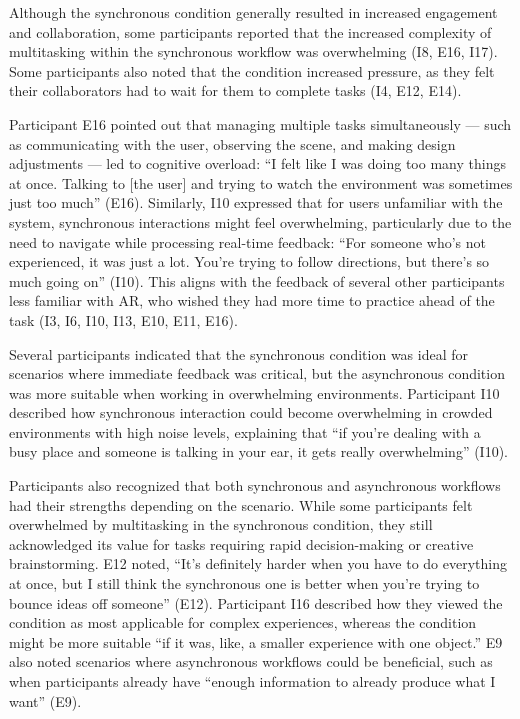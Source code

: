 Although the synchronous condition generally resulted in increased engagement and collaboration, some participants reported that the increased complexity of multitasking within the synchronous workflow was overwhelming (I8, E16, I17). Some participants also noted that the \sync condition increased pressure, as they felt their collaborators had to wait for them to complete tasks (I4, E12, E14). 

Participant E16 pointed out that managing multiple tasks simultaneously --- such as communicating with the \insitu user, observing the scene, and making design adjustments --- led to cognitive overload: ``I felt like I was doing too many things at once. Talking to [the \insitu user] and trying to watch the environment was sometimes just too much'' (E16). Similarly, I10 expressed that for users unfamiliar with the system, synchronous interactions might feel overwhelming, particularly due to the need to navigate while processing real-time feedback: ``For someone who's not experienced, it was just a lot. You're trying to follow directions, but there's so much going on'' (I10). This aligns with the feedback of several other participants less familiar with AR, who wished they had more time to practice ahead of the task (I3, I6, I10, I13, E10, E11, E16).

Several participants indicated that the synchronous condition was ideal for scenarios where immediate feedback was critical, but the asynchronous condition was more suitable when working in overwhelming environments. Participant I10 described how synchronous interaction could become overwhelming in crowded environments with high noise levels, explaining that ``if you're dealing with a busy place and someone is talking in your ear, it gets really overwhelming'' (I10).

Participants also recognized that both synchronous and asynchronous workflows had their strengths depending on the scenario. While some participants felt overwhelmed by multitasking in the synchronous condition, they still acknowledged its value for tasks requiring rapid decision-making or creative brainstorming. E12 noted, ``It's definitely harder when you have to do everything at once, but I still think the synchronous one is better when you're trying to bounce ideas off someone'' (E12). Participant I16 described how they viewed the \sync condition as most applicable for complex experiences, whereas the \async condition might be more suitable ``if it was, like, a smaller experience with one object.'' E9 also noted scenarios where asynchronous workflows could be beneficial, such as when \insitu participants already have ``enough information to already produce what I want'' (E9).

